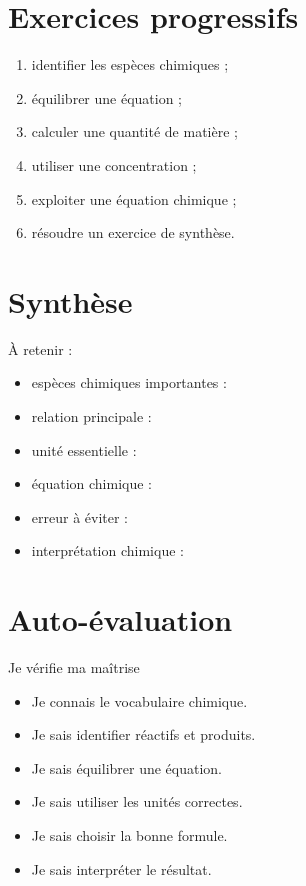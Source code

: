 \documentclass[11pt,a4paper]{article}
\begin{document}
\section{Exercices progressifs}

\begin{cadreactivite}
\begin{enumerate}
    \item identifier les espèces chimiques ;
    \item équilibrer une équation ;
    \item calculer une quantité de matière ;
    \item utiliser une concentration ;
    \item exploiter une équation chimique ;
    \item résoudre un exercice de synthèse.
\end{enumerate}
\end{cadreactivite}

\section{Synthèse}

\begin{cadresynthese}
À retenir :

\begin{itemize}
    \item espèces chimiques importantes : \dotfill
    \item relation principale : \dotfill
    \item unité essentielle : \dotfill
    \item équation chimique : \dotfill
    \item erreur à éviter : \dotfill
    \item interprétation chimique : \dotfill
\end{itemize}
\end{cadresynthese}

\section{Auto-évaluation}

\begin{cadregris}{Je vérifie ma maîtrise}
\begin{itemize}
    \item[$\square$] Je connais le vocabulaire chimique.
    \item[$\square$] Je sais identifier réactifs et produits.
    \item[$\square$] Je sais équilibrer une équation.
    \item[$\square$] Je sais utiliser les unités correctes.
    \item[$\square$] Je sais choisir la bonne formule.
    \item[$\square$] Je sais interpréter le résultat.
\end{itemize}
\end{cadregris}
\end{document}
